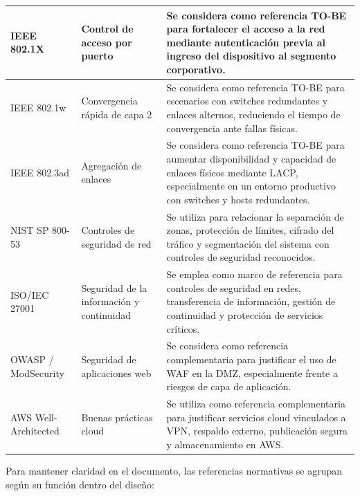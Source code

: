 \documentclass[11pt, a4paper, oneside]{report}
\begin{document}
\begin{xltabular}{\textwidth}{@{}|L{3.5cm}|L{3.8cm}|X|@{}}
{\small IEEE 802.1X\newline \cite{ieee8021x}} &
{\small Control de acceso por puerto} &
{\small Se considera como referencia TO-BE para fortalecer el acceso a la red mediante autenticación previa al ingreso del dispositivo al segmento corporativo.} \\ \hline

{\small IEEE 802.1w} &
{\small Convergencia rápida de capa 2} &
{\small Se considera como referencia TO-BE para escenarios con switches redundantes y enlaces alternos, reduciendo el tiempo de convergencia ante fallas físicas.} \\ \hline

{\small IEEE 802.3ad} &
{\small Agregación de enlaces} &
{\small Se considera como referencia TO-BE para aumentar disponibilidad y capacidad de enlaces físicos mediante LACP, especialmente en un entorno productivo con switches y hosts redundantes.} \\ \hline

{\small NIST SP 800-53} &
{\small Controles de seguridad de red} &
{\small Se utiliza para relacionar la separación de zonas, protección de límites, cifrado del tráfico y segmentación del sistema con controles de seguridad reconocidos.} \\ \hline

{\small ISO/IEC 27001} &
{\small Seguridad de la información y continuidad} &
{\small Se emplea como marco de referencia para controles de seguridad en redes, transferencia de información, gestión de continuidad y protección de servicios críticos.} \\ \hline

{\small OWASP / ModSecurity} &
{\small Seguridad de aplicaciones web} &
{\small Se considera como referencia complementaria para justificar el uso de WAF en la DMZ, especialmente frente a riesgos de capa de aplicación.} \\ \hline

{\small AWS Well-Architected} &
{\small Buenas prácticas cloud} &
{\small Se utiliza como referencia complementaria para justificar servicios cloud vinculados a VPN, respaldo externo, publicación segura y almacenamiento en AWS.} \\ \hline

\end{xltabular}

\normalsize

Para mantener claridad en el documento, las referencias normativas se agrupan según su función dentro del diseño:
\end{document}
